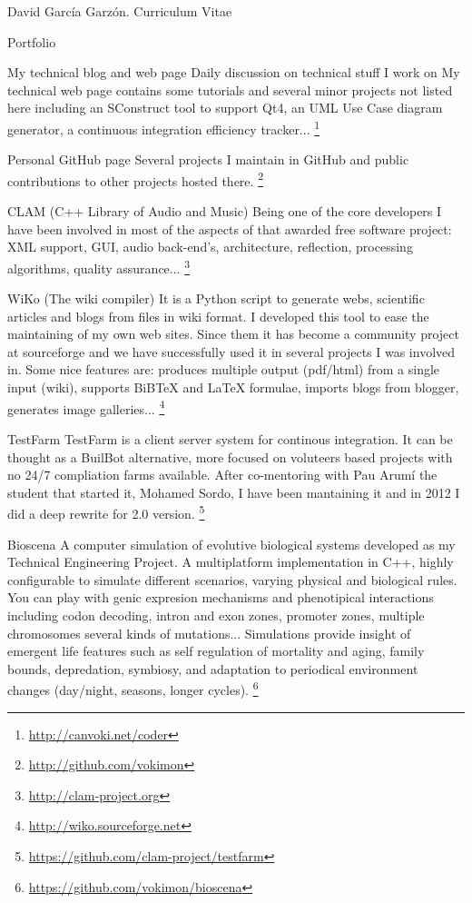 \documentclass{article}
\begin{document}
\begin{cv}{David García Garzón. Curriculum Vitae}
\begin{cvlist}{Portfolio}
\item[My technical blog and web page]
Daily discussion on technical stuff I work on My technical web page contains some tutorials and several minor projects not listed here including an SConstruct tool to support Qt4, an UML Use Case diagram generator, a continuous integration efficiency tracker...
\footnote{\href{http://canvoki.net/coder}{http://canvoki.net/coder}}
\item[Personal GitHub page]
Several projects I maintain in GitHub and public contributions to other projects hosted there.
\footnote{\href{http://github.com/vokimon}{http://github.com/vokimon}}
\item[CLAM (C++ Library of Audio and Music)]
Being one of the core developers I have been involved in most of the aspects of that awarded free software project: XML support, GUI, audio back-end's, architecture, reflection, processing algorithms, quality assurance...
\footnote{\href{http://clam-project.org}{http://clam-project.org}}
\item[WiKo (The wiki compiler)]
It is a Python script to generate webs, scientific articles and blogs from files in wiki format.  I developed this tool to ease the maintaining of my own web sites. Since them it has become a community project at sourceforge and we have successfully used it in several projects I was involved in. Some nice features are: produces multiple output (pdf/html) from a single input (wiki), supports BiBTeX and LaTeX formulae, imports blogs from blogger, generates image galleries...
\footnote{\href{http://wiko.sourceforge.net}{http://wiko.sourceforge.net}}
\item[TestFarm]
TestFarm is a client server system for continous integration. It can be thought as a BuilBot alternative, more focused on voluteers based projects with no 24/7 compliation farms available. After co-mentoring with Pau Arumí the student that started it, Mohamed Sordo, I have been mantaining it and in 2012 I did a deep rewrite for 2.0 version.
\footnote{\href{https://github.com/clam-project/testfarm}{https://github.com/clam-project/testfarm}}
\item[Bioscena]
A computer simulation of evolutive biological systems developed as my Technical Engineering Project. A multiplatform implementation in C++, highly configurable to simulate different scenarios, varying physical and biological rules. You can play with genic expresion mechanisms and phenotipical interactions including codon decoding, intron and exon zones, promoter zones, multiple chromosomes several kinds of mutations... Simulations provide insight of emergent life features such as self regulation of mortality and aging, family bounds, depredation, symbiosy, and adaptation to periodical environment changes (day/night, seasons, longer cycles).
\footnote{\href{https://github.com/vokimon/bioscena}{https://github.com/vokimon/bioscena}}

\end{cvlist}


\vspace{2cm}

\end{cv}
\end{document}
